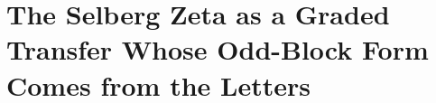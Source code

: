 
\section{The Selberg Zeta as a Graded Transfer Whose Odd-Block Form Comes from the Letters}
\label{sec:selberg-letters}

